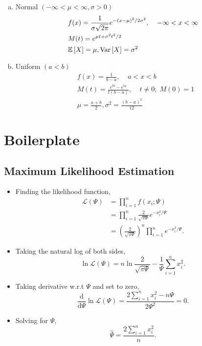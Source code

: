 \documentclass{article}
\begin{document}
\begin{enumerate}[(a)]
            \item Normal $(-\infty < \mu < \infty, \sigma > 0)$
            $$
            \begin{aligned}
                & f(x) = \frac{1}{\sigma\sqrt{2\pi}}e^{-(x - \mu)^2 / 2\sigma^2}, \;\;\;\; -\infty < x < \infty \\
                & M(t) = e^{\mu t + \sigma^2t^2 / 2} \\
                & \mathbb{E}\left[X\right] = \mu, \text{Var}\left[X\right] = \sigma^2
            \end{aligned}
            $$
            
            \item Uniform $(a < b)$
            $$
            \begin{aligned}
                & f(x) = \frac{1}{b - a}, \;\;\;\; a < x < b \\
                & M(t) = \frac{e^{tb} - e^{ta}}{t(b - a)}, \;\;\;\; t \neq 0; \; M(0) = 1 \\
                & \mu = \frac{a + b}{2}, \sigma^2 = \frac{(b - a)^2}{12}
            \end{aligned}
            $$
        \end{enumerate}

\newpage
\section{Boilerplate}
    \subsection{Maximum Likelihood Estimation}
    \begin{itemize}
        \item Finding the likelihood function,
        $$
        \begin{aligned}
            \mathcal{L}(\Psi) &= \prod_{i = 1}^n f(x_i; \Psi)\\
            &= \prod_{i = 1}^n \frac{2}{\sqrt{\pi\Psi}}e^{-x_i^2/\Psi}\\
            &= \left(\frac{2}{\sqrt{\pi\Psi}}\right)^n\prod_{i = 1}^n e^{-x_i^2 / \Psi}.
        \end{aligned}
        $$
        \item Taking the natural log of both sides,
        $$
        \ln\mathcal{L}(\Psi) = n\ln\frac{2}{\sqrt{\pi\Psi}} - \frac{1}{\Psi}\sum_{i = 1}^n x_i^2.
        $$
        \item Taking derivative w.r.t $\Psi$ and set to zero,
        $$
        \frac{\text{d}}{\text{d}\Psi} \ln\mathcal{L}(\Psi) = \frac{2 \sum_{i = 1}^n x_i^2 - n \Psi }{2 \Psi ^2} = 0.
        $$
        \item Solving for $\Psi$,
        $$
        \boxed{\hat{\Psi} = \frac{2\sum_{i = 1}^n x_i^2}{n}}.
        $$
    \end{itemize}
\end{document}
